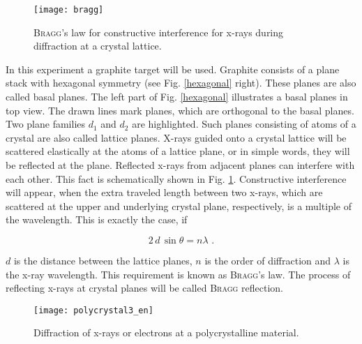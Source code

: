 \documentclass{tudphygp_eng}
\begin{document}
\begin{figure}[htb]
\centering
\texttt{[image: bragg]}
\caption{\textsc{Bragg}'s law for constructive interference for x-rays during diffraction at a crystal lattice.\label{bragg}}
\end{figure}
In this experiment a graphite target will be used. Graphite consists of a plane stack with hexagonal symmetry (see Fig. \ref{hexagonal} right). These planes are also called basal planes. The left part of Fig. \ref{hexagonal} illustrates a basal planes in top view. The drawn lines mark planes, which are orthogonal to the basal planes. Two plane families $d_1$ and $d_2$ are highlighted. Such planes consisting of atoms of a crystal are also called lattice planes. 
X-rays guided onto a crystal lattice will be scattered elastically at the atoms of a lattice plane, or in simple words, they will be reflected at the plane. Reflected x-rays from adjacent planes can interfere with each other. This fact is schematically shown in Fig. \ref{bragg}. Constructive interference will appear, when the extra traveled length between two x-rays, which are scattered at the upper and underlying crystal plane, respectively, is a multiple of the wavelength. This is exactly the case, if

\begin{equation}
2 \,d\,\sin\theta=n\lambda\,\,.\label{B2}
\end{equation}

$d$ is the distance between the lattice planes, $n$ is the order of diffraction and $\lambda$ is the x-ray wavelength. This requirement is known as \textsc{Bragg}'s law. The process of reflecting x-rays at crystal planes will be called \textsc{Bragg} reflection.

\begin{figure}[htb]
\centering
\texttt{[image: polycrystal3\_en]}
\caption{Diffraction of x-rays or electrons at a polycrystalline material.\label{polycrystal3}}
\end{figure}
\end{document}
